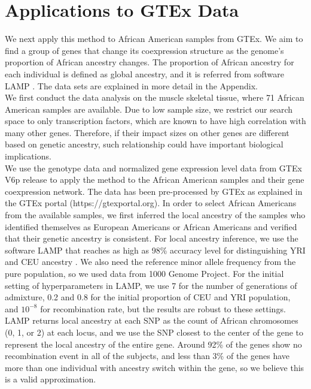 \documentclass[aoas,preprint]{imsart}
\numberwithin{equation}{section}
\theoremstyle{plain}
\begin{document}
\section{Applications to GTEx Data} \label{sec:applications}
We next apply this method to African American samples from GTEx. We aim to find a group of genes that change its coexpression structure as the genome's proportion of African ancestry changes. The proportion of African ancestry for each individual is defined as global ancestry, and it is referred from software LAMP \cite{pacsaniuc2009imputation}. The data sets are explained in more detail in the Appendix.\\

We first conduct the data analysis on the muscle skeletal tissue, where 71 African American samples are available. Due to low sample size, we restrict our search space to only transcription factors, which are known to have high correlation with many other genes. Therefore, if their impact sizes on other genes are different based on genetic ancestry, such relationship could have important biological implications. \\

We use the genotype data and normalized gene expression level data from GTEx V6p release \cite{lonsdale2013genotype} to apply the method to the African American samples and their gene coexpression network. The data has been pre-processed by GTEx as explained in the GTEx portal (https://gtexportal.org). In order to select African Americans from the available samples, we first inferred the local ancestry of the samples who identified themselves as European Americans or African Americans and verified that their genetic ancestry is consistent. For local ancestry inference, we use the software LAMP that reaches as high as 98\% accuracy level for distinguishing YRI and CEU ancestry \cite{pacsaniuc2009imputation}. We also need the reference minor allele frequency from the pure population, so we used data from 1000 Genome Project. For the initial setting of hyperparameters in LAMP, we use 7 for the number of generations of admixture, 0.2 and 0.8 for the initial proportion of CEU and YRI population, and $10^{-8}$ for recombination rate, but the results are robust to these settings. LAMP returns local ancestry at each SNP as the count of African chromosomes (0, 1, or 2) at each locus, and we use the SNP closest to the center of the gene to represent the local ancestry of the entire gene.  Around 92\% of the genes show no recombination event in all of the subjects, and less than 3\% of the genes have more than one individual with ancestry switch within the gene, so we believe this is a valid approximation. \\
\end{document}
